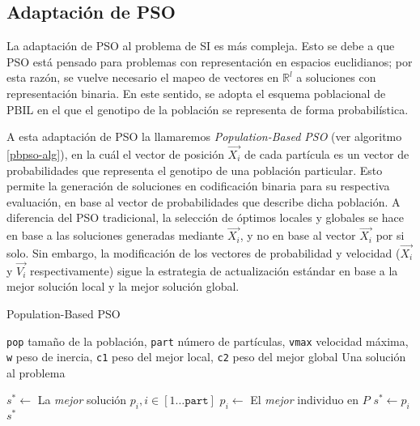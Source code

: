 \subsection{Adaptación de PSO}

La adaptación de PSO al problema de SI es más compleja. Esto se debe a que PSO está pensado para problemas con representación en espacios euclidianos; por esta razón, se vuelve necesario el mapeo de vectores en $\mathbb{R}^l$ a soluciones con representación binaria. En este sentido, se adopta el esquema poblacional de PBIL en el que el genotipo de la población se representa de forma probabilística.

A esta adaptación de PSO la llamaremos \emph{Population-Based PSO} (ver algoritmo \ref{pbpso-alg}), en la cuál el vector de posición $\vec{X_i}$ de cada partícula es un vector de probabilidades que representa el genotipo de una población particular. Esto permite la generación de soluciones en codificación binaria para su respectiva evaluación, en base al vector de probabilidades que describe dicha población. A diferencia del PSO tradicional, la selección de óptimos locales y globales se hace en base a las soluciones generadas mediante $\vec{X_i}$, y no en base al vector $\vec{X_i}$ por si solo. Sin embargo, la modificación de los vectores de probabilidad y velocidad ($\vec{X_i}$ y $\vec{V_i}$ respectivamente) sigue la estrategia de actualización estándar en base a la mejor solución local y la mejor solución global.

\begin{algorithm}
\caption{Population-Based PSO}
\label{pbpso-alg}
\begin{algorithmic}[1]

\Require \texttt{pop} tamaño de la población,
	\texttt{part} número de partículas,
	\texttt{vmax} velocidad máxima,
	\texttt{w} peso de inercia,
	\texttt{c1} peso del mejor local,
	\texttt{c2} peso del mejor global
\Ensure Una solución al problema

\EndFor
\State $s^* \gets$ La \emph{mejor} solución $p_i, i \in [1 \dots \texttt{part}]$
			\State $p_i \gets$ El \emph{mejor} individuo en $P$
				\State $s^* \gets p_i$
			\EndIf
		\EndIf
	\EndFor
\EndWhile
\State \Return $s^*$

\end{algorithmic}
\end{algorithm}

